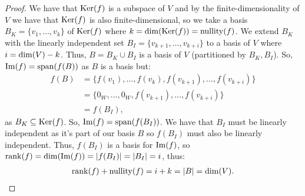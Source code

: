 \begin{proof}
    We have that $\operatorname{Ker}(f)$ is a subspace of $V$ and
    by the finite-dimensionality of $V$ we have that $\operatorname{Ker}(f)$ is also
    finite-dimensional, so we take a basis $B_K = \{v_1, \ldots, v_k\}$ 
    of $\operatorname{Ker}(f)$ where $k = \operatorname{dim}(\operatorname{Ker}(f)) = \operatorname{nullity}(f)$. We extend $B_K$
    with the linearly independent set $B_I = \{v_{k + 1}, \ldots, v_{k + i}\}$
    to a basis of $V$ where $i = \operatorname{dim}(V) - k$. Thus, $B = B_K \cup B_I$
    is a basis of $V$ (partitioned by $B_K, B_I$).
    So, $\operatorname{Im}(f) = \operatorname{span}(f(B))$ as $B$ is a basis but: \begin{align*}
        f(B) 
        &= \{f(v_1), \ldots, f(v_k), f(v_{k + 1}), \ldots, f(v_{k + i})\} \\
        &= \{0_W, \ldots, 0_W, f(v_{k + 1}), \ldots, f(v_{k + i})\} \\
        &= f(B_I),
    \end{align*} as $B_K \subseteq \operatorname{Ker}(f)$. So, $\operatorname{Im}(f) = \operatorname{span}(f(B_I))$.
    We have that $B_I$ must be linearly independent as it's part of our
    basis $B$ so $f(B_I)$ must also be linearly independent. Thus, $f(B_I)$
    is a basis for $\operatorname{Im}(f)$, so $\operatorname{rank}(f) = \operatorname{dim}(\operatorname{Im}(f)) = |f(B_I)| = |B_I| = i$,
    thus: \begin{gather*}
        \operatorname{rank}(f) + \operatorname{nullity}(f) = i + k = |B| = \operatorname{dim}(V).
    \end{gather*} 
\end{proof}